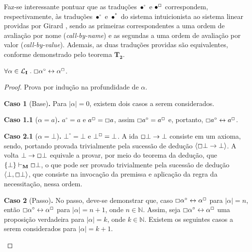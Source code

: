         Faz-se interessante pontuar que as traduções $\bullet^\circ$ e $\bullet^\Box$ correspondem, respectivamente, às traduções $\bullet^\circ$ e $\bullet^*$ do sistema intuicionista ao sistema linear providas por Girard \cite{Girard}, sendo as primeiras correspondentes a uma ordem de avaliação por nome (\textit{call-by-name}) e as segundas a uma ordem de avaliação por valor (\textit{call-by-value}). 
        Ademais, as duas traduções providas são equivalentes, conforme demonstrado pelo teorema $\mathbf{T_2}$.

        \begin{theorem}
            $\forall\alpha\in\mathcal{L}_\mathbf{I}\mathrel{.}\Box\alpha^\circ\leftrightarrow\alpha^\Box$.
        \end{theorem}

        \begin{proof}
            Prova por indução na profundidade de $\alpha$.

            \begin{case}
                \textbf{Caso 1} (Base)\textbf{.}
                    Para $|\alpha| = 0$, existem dois casos a serem considerados.

                    \begin{case}
                    \textbf{Caso 1.1} ($\alpha = a$)\textbf{.}
                        $a^\circ = a$ e $a^\Box = \Box a$, assim $\Box a^\circ = a^\Box$ e, portanto, $\Box a^\circ \leftrightarrow a^\Box$.
                    \end{case}
                    \begin{case}
                    \textbf{Caso 2.1} ($\alpha = \bot$)\textbf{.}
                        $\bot^\circ = \bot$ e $\bot^\Box = \bot$. A ida $\Box\bot\to\bot$ consiste em um axioma, sendo, portando provada trivialmente pela sucessão de dedução $\langle\Box\bot\to\bot\rangle$.
                        A volta $\bot\to\Box\bot$ equivale a provar, por meio do teorema da dedução, que $\{\bot\}\vdash_\mathbf{M}\Box\bot$, o que pode ser provado trivialmente pela sucessão de dedução $\langle\bot, \Box\bot\rangle$, que consiste na invocação da premissa e aplicação da regra da necessitação, nessa ordem.
                    \end{case}
            \end{case}

            \begin{case}
                \textbf{Caso 2} (Passo)\textbf{.} No passo, deve-se demonstrar que, caso $\Box\alpha^\circ\leftrightarrow\alpha^\Box$ para $|\alpha| = n$, 
                então $\Box\alpha^\circ\leftrightarrow\alpha^\Box$ para $|\alpha| = n + 1$, onde $n \in \mathbb{N}$. Assim, seja $\Box\alpha^\circ\leftrightarrow\alpha^\Box$ uma proposição verdadeira para $|\alpha| = k$, onde $k \in \mathbb{N}$. Existem os seguintes casos a serem considerados para $|\alpha| = k + 1$.


\end{case}
\end{proof}
